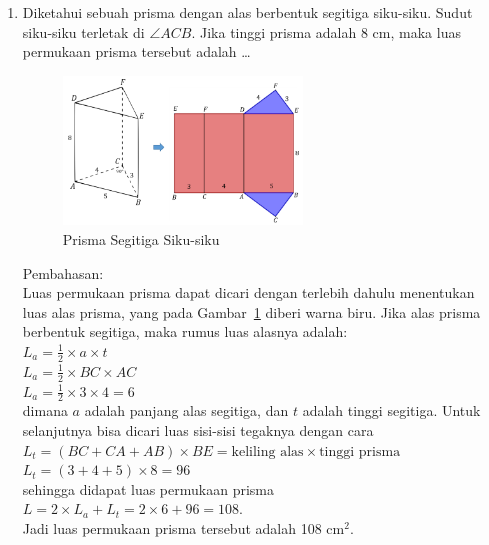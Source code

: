 \documentclass[12pt]{article}
\begin{document}
\begin{enumerate}
\begin{enumerate}
        \begin{enumerate}[label=\arabic*)]
            \item Diketahui sebuah prisma dengan alas berbentuk segitiga siku-siku. Sudut siku-siku terletak di \( \angle ACB \). Jika tinggi prisma adalah 8 cm, maka luas permukaan prisma tersebut adalah \dots\\
            \begin{figure}[H]
                \centering
                \includegraphics[width=0.6\textwidth]{images/prismasegitigasiku.png}
                \caption{Prisma Segitiga Siku-siku}
                \label{prismasegitigasiku}
            \end{figure}
            Pembahasan:\\
            Luas permukaan prisma dapat dicari dengan terlebih dahulu menentukan luas alas prisma, yang pada Gambar~\ref{prismasegitigasiku} diberi warna biru. Jika alas prisma berbentuk segitiga, maka rumus luas alasnya adalah:\\
            $ L_a = \frac{1}{2} \times a \times t $\\
            $ L_a = \frac{1}{2} \times BC \times AC$\\
            $ L_a = \frac{1}{2} \times 3 \times 4 = 6$\\
            dimana \(a\) adalah panjang alas segitiga, dan \(t\) adalah tinggi segitiga. Untuk selanjutnya bisa dicari luas sisi-sisi tegaknya dengan cara\\
            $ L_t = (BC + CA + AB) \times BE = \text{keliling alas} \times \text{tinggi prisma} $\\
            $ L_t = (3+4+5) \times 8 = 96 $\\
            sehingga didapat luas permukaan prisma\\
            $ L = 2\times L_a + L_t = 2 \times 6 + 96 = 108. $\\
            Jadi luas permukaan prisma tersebut adalah 108 \( \text{cm}^2.\)
        \end{enumerate}

\end{enumerate}
\end{enumerate}
\end{document}
